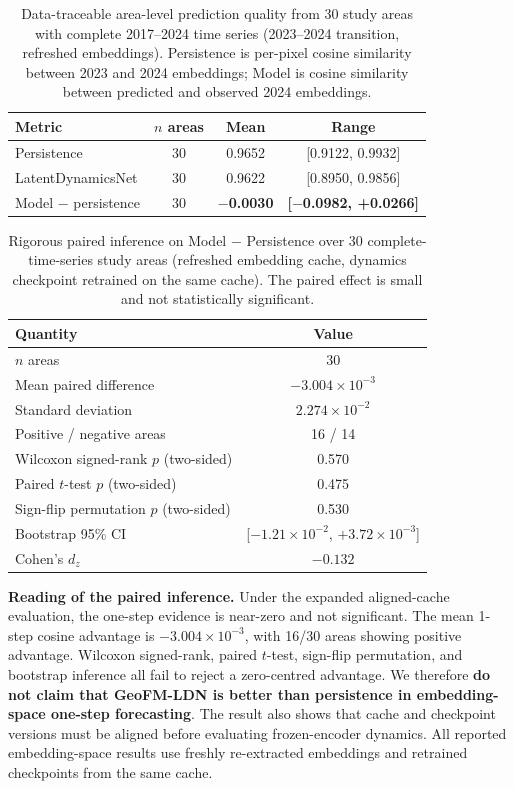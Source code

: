 \documentclass{article}
\begin{document}
\begin{table}[htbp]
\centering
\caption{Data-traceable area-level prediction quality from 30 study areas with complete 2017--2024 time series (2023--2024 transition, refreshed embeddings). Persistence is per-pixel cosine similarity between 2023 and 2024 embeddings; Model is cosine similarity between predicted and observed 2024 embeddings.}
\label{tab:aggregate}
\begin{tabular}{lccc}
\toprule
Metric & $n$ areas & Mean & Range \\
\midrule
Persistence & 30 & 0.9652 & [0.9122, 0.9932] \\
LatentDynamicsNet & 30 & 0.9622 & [0.8950, 0.9856] \\
Model $-$ persistence & 30 & \textbf{$-$0.0030} & \textbf{[$-$0.0982, +0.0266]} \\
\bottomrule
\end{tabular}
\end{table}

\begin{table}[htbp]
\centering
\caption{Rigorous paired inference on Model $-$ Persistence over 30 complete-time-series study areas (refreshed embedding cache, dynamics checkpoint retrained on the same cache). The paired effect is small and not statistically significant.}
\label{tab:paired_inference}
\small
\begin{tabular}{lc}
\toprule
Quantity & Value \\
\midrule
$n$ areas & 30 \\
Mean paired difference & $-3.004 \times 10^{-3}$ \\
Standard deviation & $2.274 \times 10^{-2}$ \\
Positive / negative areas & 16 / 14 \\
Wilcoxon signed-rank $p$ (two-sided) & 0.570 \\
Paired $t$-test $p$ (two-sided) & 0.475 \\
Sign-flip permutation $p$ (two-sided) & 0.530 \\
Bootstrap 95\% CI & [$-1.21\times10^{-2}$, $+3.72\times10^{-3}$] \\
Cohen's $d_z$ & $-0.132$ \\
\bottomrule
\end{tabular}
\end{table}

\textbf{Reading of the paired inference.} Under the expanded aligned-cache evaluation, the one-step evidence is near-zero and not significant. The mean 1-step cosine advantage is $-3.004\times10^{-3}$, with 16/30 areas showing positive advantage. Wilcoxon signed-rank, paired $t$-test, sign-flip permutation, and bootstrap inference all fail to reject a zero-centred advantage. We therefore \textbf{do not claim that GeoFM-LDN is better than persistence in embedding-space one-step forecasting}. The result also shows that cache and checkpoint versions must be aligned before evaluating frozen-encoder dynamics. All reported embedding-space results use freshly re-extracted embeddings and retrained checkpoints from the same cache.
\end{document}
